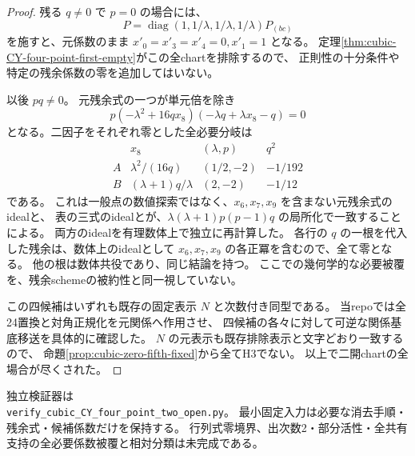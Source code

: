 \begin{proof}
残る $q\ne0$ で $p=0$ の場合には、
\[
 P=\operatorname{diag}(1,1/\lambda,1/\lambda,1/\lambda)P_{(bc)}
\]
を施すと、元係数のまま $x'_0=x'_3=x'_4=0,x'_1=1$ となる。
定理\ref{thm:cubic-CY-four-point-first-empty}がこの全chartを排除するので、
正則性の十分条件や特定の残余係数の零を追加してはいない。

以後 $pq\ne0$。
元残余式の一つが単元倍を除き
\[
 p(-\lambda^2+16qx_8)(-\lambda q+\lambda x_8-q)=0
\]
となる。二因子をそれぞれ零とした全必要分岐は
\[
\begin{array}{c|c|c|c}
 &x_8&(\lambda,p)&q^2\\\hline
 A&\lambda^2/(16q)&(1/2,-2)&-1/192\\
 B&(\lambda+1)q/\lambda&(2,-2)&-1/12
\end{array}
\]
である。
これは一般点の数値探索ではなく、$x_6,x_7,x_9$ を含まない元残余式のidealと、
表の三式のidealとが、$\lambda(\lambda+1)p(p-1)q$ の局所化で一致することによる。
両方のidealを有理数体上で独立に再計算した。
各行の $q$ の一根を代入した残余は、数体上のidealとして
$x_6,x_7,x_9$ の各正冪を含むので、全て零となる。
他の根は数体共役であり、同じ結論を持つ。
ここでの幾何学的な必要被覆を、残余schemeの被約性と同一視していない。

この四候補はいずれも既存の固定表示 $N$ と次数付き同型である。
当repoでは全24置換と対角正規化を元関係へ作用させ、
四候補の各々に対して可逆な関係基底移送を具体的に確認した。
$N$ の元表示も既存排除表示と文字どおり一致するので、
命題\ref{prop:cubic-zero-fifth-fixed}から全てH3でない。
以上で二開chartの全場合が尽くされた。
\end{proof}

独立検証器は\\
\texttt{verify\_cubic\_CY\_four\_point\_two\_open.py}。
最小固定入力は必要な消去手順・残余式・候補係数だけを保持する。
行列式零境界、出次数2・部分活性・全共有支持の全必要係数被覆と相対分類は未完成である。
